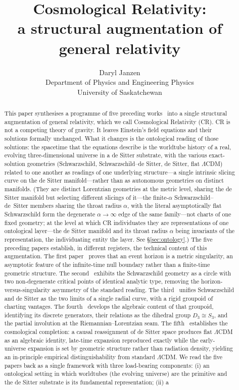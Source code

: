 \documentclass[11pt,a4paper]{article}
\title{Cosmological Relativity:\\
\large a structural augmentation of general relativity}
\author{Daryl Janzen\\
\small Department of Physics and Engineering Physics\\
\small University of Saskatchewan}
\date{}
\theoremstyle{definition}
\begin{document}
\maketitle

\begin{abstract}
This paper synthesises a programme of five preceding works~\cite{JanzenBHcausality, JanzenCircle, JanzenSlicing, JanzenGroupoid, JanzenCRcosmology} into a single structural augmentation of general relativity, which we call Cosmological Relativity (CR). CR is not a competing theory of gravity. It leaves Einstein's field equations and their solutions formally unchanged. What it changes is the ontological reading of those solutions: the spacetime that the equations describe is the worldtube history of a real, evolving three-dimensional universe in a de Sitter substrate, with the various exact-solution geometries (Schwarzschild, Schwarzschild--de Sitter, de Sitter, flat $\Lambda$CDM) related to one another as readings of one underlying structure---a single intrinsic slicing curve on the de Sitter manifold---rather than as autonomous geometries on distinct manifolds. (They are distinct Lorentzian geometries at the metric level, sharing the de Sitter manifold but selecting different slicings of it---the finite-$\alpha$ Schwarzschild--de~Sitter members sharing the throat radius $\alpha$, with the literal asymptotically flat Schwarzschild form the degenerate $\alpha\to\infty$ edge of the same family---not charts of one fixed geometry; at the level at which CR individuates they are representations of one ontological layer---the de Sitter manifold and its throat radius $\alpha$ being invariants of the representation, the individuating entity the layer. See \S\ref{sec:ontology}.) The five preceding papers establish, in different registers, the technical content of this augmentation. The first paper~\cite{JanzenBHcausality} proves that an event horizon is a metric singularity, an asymptotic feature of the infinite-time null boundary rather than a finite-time geometric structure. The second~\cite{JanzenCircle} exhibits the Schwarzschild geometry as a circle with two non-degenerate critical points of identical analytic type, removing the horizon-versus-singularity asymmetry of the standard reading. The third~\cite{JanzenSlicing} unifies Schwarzschild and de Sitter as the two limits of a single radial curve, with a rigid groupoid of charting vantages. The fourth~\cite{JanzenGroupoid} develops the algebraic content of that groupoid, identifying its discrete generators, their relations as the dihedral group $D_{3}\cong S_{3}$, and the partial involution at the Riemannian--Lorentzian seam. The fifth~\cite{JanzenCRcosmology} establishes the cosmological completion: a causal reassignment of de Sitter space produces flat $\Lambda$CDM as an algebraic identity, late-time expansion reproduced exactly while the early-universe expansion is set by geometric structure rather than radiation density, yielding an in-principle empirical distinguishability from standard $\Lambda$CDM. We read the five papers back as a single framework with three load-bearing components: (i) an ontological setting in which worldtubes (the evolving universe) are the primitive and the de Sitter substrate is its fundamental representation; (ii) a 
\end{abstract}
\end{document}
